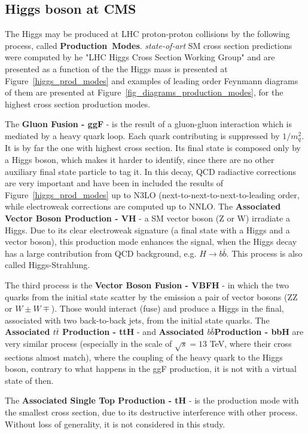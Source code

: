\subsection{Higgs boson at CMS}
\label{section_sm_vb_results}

The Higgs may be produced at LHC proton-proton collisions by the following process, called \mbox{\textbf{Production Modes}}. \textit{state-of-art} SM cross section predictions were computed by he "LHC Higgs Cross Section Working Group"\cite{deFlorian:2016spz} and are presented as a function of the the Higgs mass is presented at Figure~\ref{higgs_prod_modes} and examples of leading order Feynmann diagrams of them are presented at Figure~\ref{fig_diagrams_production_modes}, for the highest cross section production modes.

The \textbf{Gluon Fusion - ggF} - is the result of a gluon-gluon interaction which is mediated by a heavy quark loop. Each quark contributing is suppressed by $1/m_{q}^{2}$. It is by far the one with highest cross section. Its final state is composed only by a Higgs boson, which makes it harder to identify, since there are no other auxiliary final state particle to tag it. In this decay, QCD radiactive corrections are very important and have been in included the results of Figure~\ref{higgs_prod_modes} up to N3LO (next-to-next-to-next-to-leading order, while electroweak corrections are computed up to NNLO. The \textbf{Associated Vector Boson Production - VH} - a SM vector boson (Z or W) irradiate a Higgs. Due to its clear electroweak signature (a final state with a Higgs and a vector boson), this production mode enhances the signal, when the Higgs decay has a large contribution from QCD background, e.g. $H \rightarrow b\bar{b}$. This process is also called Higgs-Strahlung.

The third process is the \textbf{Vector Boson Fusion - VBFH} - in which the two quarks from the initial state scatter by the emission a pair of vector bosons (ZZ or $W{\pm}W{\mp}$). Those would interact (fuse) and produce a Higgs in the final, associated with two back-to-back jets, from the initial state quarks. The \textbf{Associated $t\bar{t}$ Production - ttH} - and \textbf{Associated $b\bar{b}$Production - bbH} are very similar process (especially in the scale of $\sqrt{s} = 13$ TeV, where their cross sections almost match), where the coupling of the heavy quark to the Higgs boson, contrary to what happens in the ggF production, it is not with a virtual state of then. 

The \textbf{Associated Single Top Production - tH} - is the production mode with the smallest cross section, due to its destructive interference with other process. Without loss of generality, it is not considered in this study.


